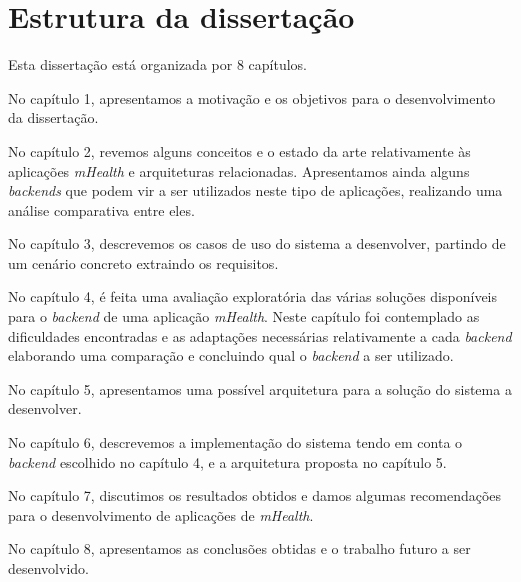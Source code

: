 \section{Estrutura da dissertação}
Esta dissertação está organizada por 8 capítulos.\par 
No capítulo 1, apresentamos a motivação e os objetivos para o desenvolvimento da dissertação.\par 
No capítulo 2, revemos alguns conceitos e o estado da arte relativamente às aplicações \textit{mHealth} e arquiteturas relacionadas. Apresentamos ainda alguns \textit{backends} que podem vir a ser utilizados neste tipo de aplicações, realizando uma análise comparativa entre eles.\par 
No capítulo 3, descrevemos os casos de uso do sistema a desenvolver, partindo de um cenário concreto extraindo os requisitos.\par 
No capítulo 4, é feita uma avaliação exploratória das várias soluções disponíveis para o \textit{backend} de uma aplicação \textit{mHealth}. Neste capítulo foi contemplado as dificuldades encontradas e as adaptações necessárias relativamente a cada \textit{backend} elaborando uma comparação e concluindo qual o \textit{backend} a ser utilizado. \par
No capítulo 5, apresentamos uma possível arquitetura para a solução do sistema a desenvolver. \par 
No capítulo 6, descrevemos a implementação do sistema tendo em conta o \textit{backend} escolhido no capítulo 4, e a arquitetura proposta no capítulo 5. \par 
No capítulo 7, discutimos os resultados obtidos e damos algumas recomendações para o desenvolvimento de aplicações de \textit{mHealth}. \par 
No capítulo 8, apresentamos as conclusões obtidas e o trabalho futuro a ser desenvolvido.
\cleardoublepage